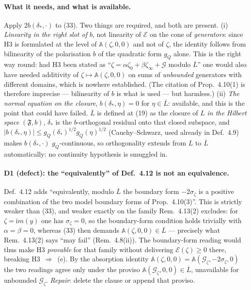 \documentclass[11pt]{article}
\newcommand{\Aop}{\mathbb A}
\begin{document}
\paragraph{What it needs, and what is available.}  Apply $2b(\delta_*,\cdot)$ to
(33).  Two things are required, and both are present.  (i) \emph{Linearity in the
right slot of $b$}, not linearity of $\mathcal E$ on the cone of \emph{generators}: since
H3 is formulated at the level of $\Aop(\zeta,0,0)$ and not of $\zeta$, the identity follows
from bilinearity of the polarisation $b$ of the quadratic form $g_Q$ alone.  This is the
right way round: had H3 been stated as ``$\zeta=\alpha\zeta_0+\beta\zeta_\infty+\mathcal G$
modulo $\overline L$'' one would also have needed additivity of $\zeta\mapsto\Aop(\zeta,0,0)$
on sums of \emph{unbounded} generators with different domains, which is nowhere established.
(The citation of Prop.~4.10(1) is therefore imprecise --- bilinearity of $b$ is what is used
--- but harmless.)  (ii) \emph{The normal equation on the closure}, $b(\delta_*,\eta)=0$ for
$\eta\in\overline L$: available, and this is the point that could have failed.  $\overline L$
is defined at (19) as the closure of $L$ \emph{in the Hilbert space} $(\mathfrak F,b)$,
$\delta_*$ is the $b$-orthogonal residual onto that closed subspace, and
$|b(\delta_*,\eta)|\le g_Q(\delta_*)^{1/2}g_Q(\eta)^{1/2}$ (Cauchy--Schwarz, used already in
Def.~4.9) makes $b(\delta_*,\cdot)$ $g_Q$-continuous, so orthogonality extends from $L$ to
$\overline L$ automatically: no continuity hypothesis is smuggled in.

\paragraph{D1 (defect): the ``equivalently'' of Def.~4.12 is not an equivalence.}  Def.~4.12
adds ``equivalently, modulo $\overline L$ the boundary form $-2\sigma_\zeta$ is a positive
combination of the two model boundary forms of Prop.~4.10(3)''.  This is strictly weaker
than (33), and weaker exactly on the family Rem.~4.13(2) excludes: for
$\zeta=\mathrm im(y)$ one has $\sigma_\zeta=0$, so the boundary-form condition holds
trivially with $\alpha=\beta=0$, whereas (33) then demands
$\Aop(\zeta,0,0)\in\overline L$ --- precisely what Rem.~4.13(2) says ``may fail''
(Rem.~4.8(ii)).  The boundary-form reading would thus make H3 \emph{provable} for that family
without delivering $\mathcal E(\zeta)\ge0$ there, breaking H3~$\Rightarrow$~(e).  By the
absorption identity $\Aop(\zeta,0,0)=\Aop(\mathcal G_\zeta,-2\sigma_\zeta,0)$ the two
readings agree only under the proviso $\Aop(\mathcal G_\zeta,0,0)\in\overline L$, unavailable
for unbounded $\mathcal G_\zeta$.  \emph{Repair}: delete the clause or append that proviso.
\end{document}
